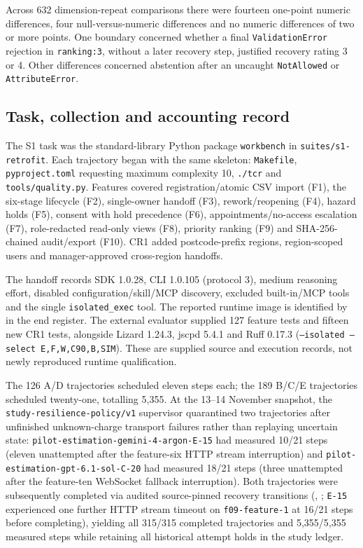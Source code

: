 Across 632 dimension-repeat comparisons there were fourteen one-point
numeric differences, four null-versus-numeric differences and no numeric
differences of two or more points. One boundary concerned whether a final
\texttt{ValidationError} rejection in \nolinkurl{ranking:3}, without a later
recovery step, justified recovery rating 3 or 4. Other differences concerned
abstention after an uncaught \texttt{NotAllowed} or \texttt{AttributeError}.

\FloatBarrier
\subsection{Task, collection and accounting record}\label{app:executiondetail}

The S1 task was the standard-library Python package \texttt{workbench}
in \nolinkurl{suites/s1-retrofit}. Each trajectory began with the same
skeleton: \texttt{Makefile}, \nolinkurl{pyproject.toml} requesting maximum
complexity 10, \texttt{./tcr} and \nolinkurl{tools/quality.py}.
Features covered registration/atomic CSV import (F1), the six-stage
lifecycle (F2), single-owner handoff (F3), rework/reopening (F4), hazard
holds (F5), consent with hold precedence (F6), appointments/no-access
escalation (F7), role-redacted read-only views (F8), priority ranking (F9)
and SHA-256-chained audit/export (F10). CR1 added postcode-prefix regions,
region-scoped users and manager-approved cross-region handoffs.

The handoff records SDK 1.0.28, CLI 1.0.105 (protocol 3), medium reasoning
effort, disabled configuration/skill/MCP discovery, excluded built-in/MCP
tools and the single \nolinkurl{isolated_exec} tool. The reported runtime
image is identified by  in the end register.
The external evaluator supplied 127 feature tests and fifteen new CR1
tests, alongside Lizard 1.24.3, jscpd 5.4.1 and Ruff 0.17.3
(\texttt{--isolated --select E,F,W,C90,B,SIM}). These are supplied source
and execution records, not newly reproduced runtime qualification.

The 126 A/D trajectories scheduled eleven steps each; the 189 B/C/E
trajectories scheduled twenty-one, totalling 5,355. At the 13--14 November
snapshot, the \nolinkurl{study-resilience-policy/v1} supervisor quarantined
two trajectories after unfinished unknown-charge transport failures rather
than replaying uncertain state:
\nolinkurl{pilot-estimation-gemini-4-argon-E-15} had measured 10/21 steps
(eleven unattempted after the feature-six HTTP stream interruption) and
\nolinkurl{pilot-estimation-gpt-6.1-sol-C-20} had measured 18/21 steps
(three unattempted after the feature-ten WebSocket fallback interruption).
Both trajectories were subsequently completed via audited source-pinned
recovery transitions (, ;
\nolinkurl{E-15} experienced one further HTTP stream timeout on
\nolinkurl{f09-feature-1} at 16/21 steps before completing), yielding
all 315/315 completed trajectories and 5,355/5,355 measured steps while
retaining all historical attempt holds in the study ledger.

